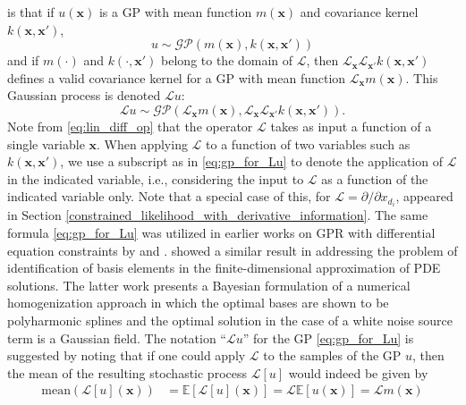 \label{pde_constraints}
 is that if $u(\mathbf{x})$ is a GP with mean function $m(\mathbf{x})$ and covariance kernel
$k(\mathbf{x},\mathbf{x'})$, 
\begin{equation}
\label{eq:gp_for_u}
u \sim \mathcal{GP}(m(\mathbf{x}),k(\mathbf{x},\mathbf{x'}))
\end{equation}
and if $m(\cdot)$ and $k(\cdot, \mathbf{x'})$ belong to the domain of $\mathcal{L}$, then
$\mathcal{L}_{\mathbf{x}} \mathcal{L}_{\mathbf{x'}} k(\mathbf{x},\mathbf{x'})$ defines a valid covariance kernel for a 
GP with mean function $\mathcal{L}_{\mathbf{x}} m(\mathbf{x})$. 
This Gaussian process is denoted $\mathcal{L}u$:
\begin{equation}
\label{eq:gp_for_Lu}
\mathcal{L}u \sim \mathcal{GP}(\mathcal{L}_{\mathbf{x}} m(\mathbf{x}), \mathcal{L}_{\mathbf{x}} \mathcal{L}_{\mathbf{x'}} k(\mathbf{x},\mathbf{x'})).
\end{equation}
Note from \eqref{eq:lin_diff_op} that the operator $\mathcal{L}$ takes as input a function of a single variable $\mathbf{x}$. When applying 
$\mathcal{L}$ to a function of two variables such as $k(\mathbf{x}, \mathbf{x'})$, we use a subscript as in \eqref{eq:gp_for_Lu} to denote the application of $\mathcal{L}$ in the indicated variable, i.e., considering the input to $\mathcal{L}$ as a function of the indicated variable only. Note that a special case of this, for $\mathcal{L} = \partial/\partial x_{d_i}$, appeared in Section \ref{constrained_likelihood_with_derivative_information}. The same formula \eqref{eq:gp_for_Lu} was utilized in earlier works on GPR with differential equation constraints by  and .  showed a similar result in addressing the problem of identification of basis elements in the finite-dimensional approximation of PDE solutions.  The latter work presents a Bayesian formulation of a numerical homogenization approach in which the optimal bases are shown to be polyharmonic splines and the optimal solution in the case of a white noise source term is a Gaussian field.
The notation ``$\mathcal{L}u$'' for the GP \eqref{eq:gp_for_Lu} is suggested by noting that if one could apply $\mathcal{L}$ to the samples of the GP $u$, then the mean
of the resulting stochastic process $\mathcal{L}[u]$ would indeed be given by 
\begin{align}
\text{mean}\left(\mathcal{L}[u](\mathbf{x})\right) &=
\mathbb{E} \left[ \mathcal{L} [u](\mathbf{x}) \right] = \mathcal{L} \mathbb{E}\left[ u(\mathbf{x}) \right] = \mathcal{L} m(\mathbf{x})
\end{align}
